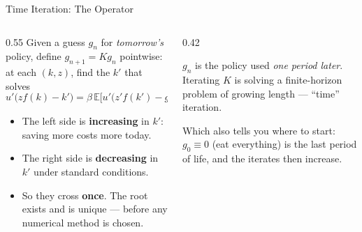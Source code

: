 \begin{frame}{Time Iteration: The Operator}
\begin{columns}[T]
\begin{column}{0.55\textwidth}
\small
Given a guess $g_n$ for \emph{tomorrow's} policy, define $g_{n+1}=Kg_n$ pointwise: at each $(k,z)$, find the $k'$ that solves
\[
  u'\big(zf(k)-k'\big)=\beta\,\mathbb{E}\Big[u'\big(z'f(k')-g_n(k',z')\big)R(k',z')\Big].
\]
\begin{itemize}\footnotesize
  \item The left side is \textbf{increasing} in $k'$: saving more costs more today.
  \item The right side is \textbf{decreasing} in $k'$ under standard conditions.
  \item So they cross \textbf{once}. The root exists and is unique --- before any numerical method is chosen.
\end{itemize}
\end{column}
\begin{column}{0.42\textwidth}
\begin{conceptbox}[title=\textbf{Read the name literally}]\small
$g_n$ is the policy used \emph{one period later}. Iterating $K$ is solving a finite-horizon problem of growing length --- ``time'' iteration.
\end{conceptbox}
\medskip
\begin{examplebox}\footnotesize
Which also tells you where to start: $g_0\equiv0$ (eat everything) is the last period of life, and the iterates then increase.
\end{examplebox}
\end{column}
\end{columns}
\vspace{1mm}
\end{frame}

